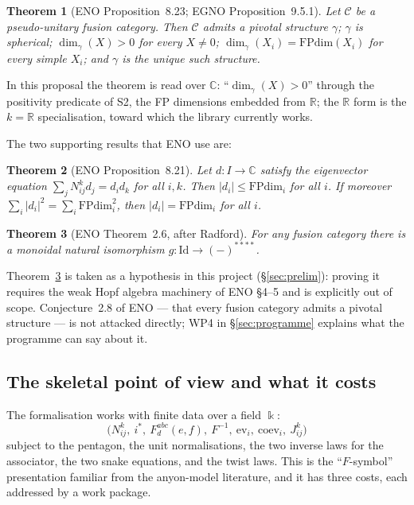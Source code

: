\documentclass[11pt,a4paper]{article}
\newtheorem{theorem}{Theorem}[section]
\theoremstyle{remark}
\newcommand{\C}{\mathcal{C}}
\newcommand{\Id}{\mathrm{Id}}
\newcommand{\FPdim}{\mathrm{FPdim}}
\newcommand{\field}{\Bbbk}
\newcommand{\R}{\mathbb{R}}
\newcommand{\Cx}{\mathbb{C}}
\begin{document}
\begin{theorem}[ENO Proposition~8.23; EGNO Proposition~9.5.1]\label{thm:eno823}
Let $\C$ be a pseudo-unitary fusion category. Then $\C$ admits a pivotal structure $\gamma$;
$\gamma$ is spherical; $\dim_\gamma(X) > 0$ for every $X \neq 0$; $\dim_\gamma(X_i) =
\FPdim(X_i)$ for every simple $X_i$; and $\gamma$ is the unique such structure.
\end{theorem}

In this proposal the theorem is read over $\Cx$: ``$\dim_\gamma(X) > 0$'' through the
positivity predicate of S2, the FP dimensions embedded from $\R$; the $\R$ form is the
$k = \R$ specialisation, toward which the library currently works.

The two supporting results that ENO use are:

\begin{theorem}[ENO Proposition~8.21]\label{thm:eno821}
Let $d \colon I \to \Cx$ satisfy the eigenvector equation $\sum_j N_{ij}^k d_j = d_i d_k$ for all
$i,k$. Then $|d_i| \le \FPdim_i$ for all $i$. If moreover $\sum_i |d_i|^2 = \sum_i \FPdim_i^2$,
then $|d_i| = \FPdim_i$ for all $i$.
\end{theorem}

\begin{theorem}[ENO Theorem~2.6, after Radford]\label{thm:quad}
For any fusion category there is a monoidal natural isomorphism $g \colon \Id \to (-)^{****}$.
\end{theorem}

Theorem~\ref{thm:quad} is taken as a hypothesis in this project (\S\ref{sec:prelim}): proving it
requires the weak Hopf algebra machinery of ENO \S4--5 and is explicitly out of scope.
Conjecture~2.8 of ENO --- that every fusion category admits a pivotal structure --- is not
attacked directly; WP4 in \S\ref{sec:programme} explains what the programme can say about it.

\subsection{The skeletal point of view and what it costs}

The formalisation works with finite data over a field $\field$:
\[
\bigl( N_{ij}^k,\ i^*, \ F^{abc}_d(e,f),\ F^{-1},\ \mathrm{ev}_i,\ \mathrm{coev}_i,\ J_{ij}^k \bigr)
\]
subject to the pentagon, the unit normalisations, the two inverse laws for the associator, the
two snake equations, and the twist laws. This is the ``$F$-symbol'' presentation familiar from
the anyon-model literature, and it has three costs, each addressed by a work package.
\end{document}
